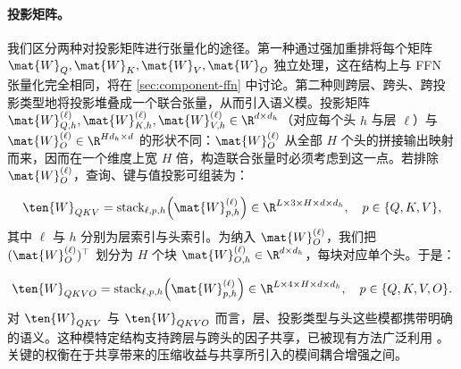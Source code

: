 
\paragraph{投影矩阵。}
我们区分两种对投影矩阵进行张量化的途径。第一种通过强加重排将每个矩阵 $\mat{W}_Q, \mat{W}_K, \mat{W}_V, \mat{W}_O$ 独立处理，这在结构上与 FFN 张量化完全相同，将在 \cref{sec:component-ffn} 中讨论。第二种则跨层、跨头、跨投影类型地将投影堆叠成一个联合张量，从而引入语义模。投影矩阵 $\mat{W}_{Q, h}^{(\ell)}, \mat{W}_{K, h}^{(\ell)}, \mat{W}_{V, h}^{(\ell)} \in\R^{d\times d_h}$（对应每个头 $h$ 与层 $\ell$）与 $\mat{W}_{O}^{(\ell)} \in\R^{Hd_h\times d}$ 的形状不同：$\mat{W}_{O}^{(\ell)}$ 从全部 $H$ 个头的拼接输出映射而来，因而在一个维度上宽 $H$ 倍，构造联合张量时必须考虑到这一点。若排除 $\mat{W}_{O}^{(\ell)}$，查询、键与值投影可组装为：

\begin{equation}
\label{eq:WQKV}
\ten{W}_{QKV} = \operatorname{stack}_{\ell,p,h}\!\left(\mat{W}_{p,h}^{(\ell)}\right) \in\R^{L\times 3\times H\times d\times d_h},
\quad p\in\{Q,K,V\},
\end{equation}
其中 $\ell$ 与 $h$ 分别为层索引与头索引。为纳入 $\mat{W}_{O}^{(\ell)}$，我们把 $(\mat{W}_{O}^{(\ell)})^\top$ 划分为 $H$ 个块 $\mat{W}_{O,h}^{(\ell)} \in\R^{d\times d_h}$，每块对应单个头。于是：

\begin{equation}
\label{eq:QKVO}
\ten{W}_{QKVO} = \operatorname{stack}_{\ell,p,h}\!\left(\mat{W}_{p,h}^{(\ell)}\right) \in\R^{L\times 4 \times H \times d \times d_h},
\quad p\in\{Q,K,V,O\}.
\end{equation}
对 $\ten{W}_{QKV}$ 与 $\ten{W}_{QKVO}$ 而言，层、投影类型与头这些模都携带明确的语义。这种模特定结构支持跨层与跨头的因子共享，已被现有方法广泛利用 \cite{li2026lestd}。关键的权衡在于共享带来的压缩收益与共享所引入的模间耦合增强之间。

